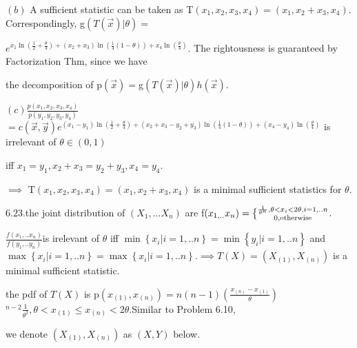 \documentclass{article}
\def\QATOPD#1#2#3#4{{#3 \atopwithdelims#1#2 #4}}%
\def\QTP#1{}
\begin{document}
$\left( b\right) $ A sufficient statistic can be taken as T$\left(
x_{1},x_{2},x_{3},x_{4}\right) =\left( x_{1},x_{2}+x_{3},x_{4}\right) .$%
Correspondingly, g$\left( T\left( \vec{x}\right) |\theta \right) =$

$e^{x_{1}\ln \left( \frac{1}{2}+\frac{\theta }{4}\right) +\left(
x_{2}+x_{3}\right) \ln \left( \frac{1}{4}\left( 1-\theta \right) \right)
+x_{4}\ln \left( \frac{\theta }{4}\right) }.$ The rightousness is guaranteed
by Factorization Thm, since we have

the decomposition of p$\left( \vec{x}\right) =$g$\left( T\left( \vec{x}%
\right) |\theta \right) h\left( \vec{x}\right) .$

$\left( c\right) \frac{p\left( x_{1},x_{2},x_{3},x_{4}\right) }{p\left(
y_{1},y_{2},y_{3},y_{4}\right) }$ $=c\left( \vec{x},\vec{y}\right) e^{\left(
x_{1}-y_{1}\right) \ln \left( \frac{1}{2}+\frac{\theta }{4}\right) +\left(
x_{2}+x_{3}-y_{2}+y_{3}\right) \ln \left( \frac{1}{4}\left( 1-\theta \right)
\right) +\left( x_{4}-y_{4}\right) \ln \left( \frac{\theta }{4}\right) }$%
\qquad is irrelevant of $\theta \in \left( 0,1\right) $

iff $x_{1}=y_{1},x_{2}+x_{3}=y_{2}+y_{3},x_{4}=y_{4}.$

\QTP{Body Math}
$\implies $ T$\left( x_{1},x_{2},x_{3},x_{4}\right) =\left(
x_{1},x_{2}+x_{3},x_{4}\right) $ is a minimal sufficient statistics for $%
\theta .$

\QTP{Body Math}
$6.23.$the joint distribution of $\left( X_{1},...X_{n}\right) $ are f$%
\left( x_{1,..}x_{n}\right) =\QATOPD\{ . {\frac{1}{\theta ^{n}},\theta
<x_{i}<2\theta ,i=1,..n}{0,\text{otherwise}}.$

\QTP{Body Math}
$\frac{f\left( x_{1},..x_{n}\right) }{f\left( y_{1},..y_{n}\right) }$is
irelevant of $\theta $ iff $\min \left\{ x_{i}|i=1,..n\right\} =\min \left\{
y_{i}|i=1,..n\right\} $ and $\max \left\{ x_{i}|i=1,..n\right\} =\max
\left\{ x_{i}|i=1,..n\right\} .\implies T\left( X\right) =\left( X_{\left(
1\right) },X_{\left( n\right) }\right) $ is a minimal sufficient statistic.

\QTP{Body Math}
the pdf of $T\left( X\right) $ is p$\left( x_{\left( 1\right) },x_{\left(
n\right) }\right) =n\left( n-1\right) \left( \frac{x_{\left( n\right)
}-x_{\left( 1\right) }}{\theta }\right) $ $^{n-2}\frac{1}{\theta ^{2}}%
,\theta <x_{\left( 1\right) }\leq x_{\left( n\right) }<2\theta .$Similar to
Problem 6.10,

we denote $\left( X_{\left( 1\right) },X_{\left( n\right) }\right) $ as $%
\left( X,Y\right) $ below.
\end{document}

